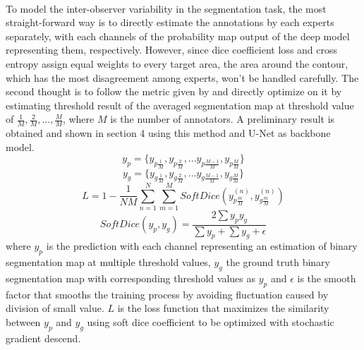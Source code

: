 \documentclass[12pt]{extarticle}
\begin{document}
\paragraph{}
To model the inter-observer variability in the segmentation task, 
the most straight-forward way is to directly estimate the annotations
 by each experts separately, with each channels of the probability 
 map output of the deep model representing them, respectively. 
 However, since dice coefficient loss and cross entropy 
assign equal weights to every target area, the area around the contour, 
which has the most disagreement among experts, won't be handled carefully\cite{Kervadec_2021}.
The second thought is to follow the metric given by \cite{qubiq} and directly 
optimize on it by estimating threshold result of the averaged segmentation map 
at threshold value of $\frac{1}{M}, \frac{2}{M}, ..., \frac{M}{M}$, 
where $M$ is the number of annotators. A preliminary result is obtained and 
shown in section 4 using this method and U-Net as backbone model.
\begin{equation}
    y_{p} = \{y_{p\frac{1}{M}}, y_{p\frac{2}{M}}, ... y_{p\frac{M-1}{M}},y_{p\frac{M}{M}}\}
\end{equation}
\begin{equation}
    y_{g} = \{y_{g\frac{1}{M}}, y_{g\frac{2}{M}}, ... y_{g\frac{M-1}{M}},y_{g\frac{M}{M}}\}
\end{equation}
\begin{equation}
    L = 1 - \frac{1}{NM}\sum_{n=1}^{N}\sum_{m=1}^{M}SoftDice(y_{p\frac{m}{M}}^{(n)}, y_{g\frac{m}{M}}^{(n)})
\end{equation}
\begin{equation}
    SoftDice(y_p, y_g) = \frac{2\sum y_p y_g}{\sum y_p +  \sum y_g + \epsilon}
\end{equation}
where $y_p$ is the prediction with each
channel representing an estimation of binary segmentation map at multiple threshold values, 
$y_g$ the ground truth binary segmentation map with corresponding threshold 
values as $y_p$ and $\epsilon$ is the smooth factor that smooths 
the training process by avoiding fluctuation caused by division of small value.
$L$ is the loss function that maximizes the similarity 
between $y_p$ and $y_g$ using soft dice coefficient 
to be optimized with stochastic gradient descend. 
\end{document}
